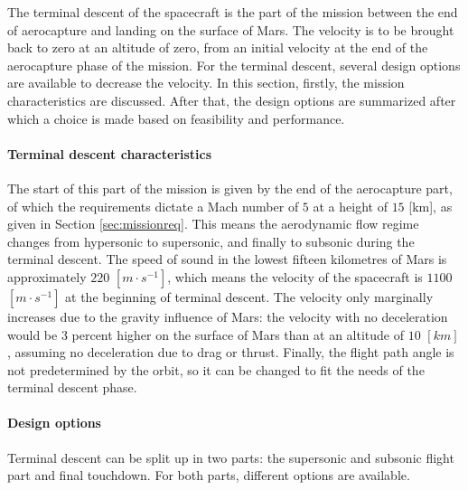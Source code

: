 The terminal descent of the spacecraft is the part of the mission between the end of aerocapture and landing on the surface of Mars. The velocity is to be brought back to zero at an altitude of zero, from an initial velocity at the end of the aerocapture phase of the mission. For the terminal descent, several design options are available to decrease the velocity. In this section, firstly, the mission characteristics are discussed. After that, the design options are summarized after which a choice is made based on feasibility and performance.

\paragraph{Terminal descent characteristics}
The start of this part of the mission is given by the end of the aerocapture part, of which the requirements dictate a Mach number of $5$ at a height of $15$ [km], as given in Section \ref{sec:missionreq}. This means the aerodynamic flow regime changes from hypersonic to supersonic, and finally to subsonic during the terminal descent. The speed of sound in the lowest fifteen kilometres of Mars is approximately $220$ $[m\cdot s^{-1}]$, which means the velocity of the spacecraft is $1100$ $[m\cdot s^{-1}]$ at the beginning of terminal descent. The velocity only marginally increases due to the gravity influence of Mars: the velocity with no deceleration would be 3 percent higher on the surface of Mars than at an altitude of $10$ $[km]$, assuming no deceleration due to drag or thrust. Finally, the flight path angle is not predetermined by the orbit, so it can be changed to fit the needs of the terminal descent phase.

\paragraph{Design options}
Terminal descent can be split up in two parts: the supersonic and subsonic flight part and final touchdown. For both parts, different options are available.

